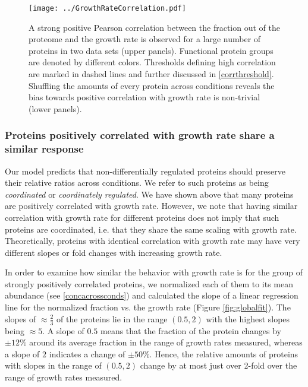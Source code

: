 \documentclass{article}
\begin{document}
\begin{figure}[H]
\begin{center}
\texttt{[image: ../GrowthRateCorrelation.pdf]}
\caption{\label{fig:growthcorr}
A strong positive Pearson correlation between the fraction out of the proteome and the growth rate is observed for a large number of proteins in two data sets (upper panels).
Functional protein groups are denoted by different colors.
Thresholds defining high correlation are marked in dashed lines and further discussed in \ref{corrthreshold}.
Shuffling the amounts of every protein across conditions reveals the bias towards positive correlation with growth rate is non-trivial (lower panels).
%
}
\end{center}
\end{figure}

\subsubsection{Proteins positively correlated with growth rate share a similar response}
\label{propchange} 
Our model predicts that non-differentially regulated proteins should preserve their relative ratios across conditions.
We refer to such proteins as being \emph{coordinated} or \emph{coordinately regulated}.
We have shown above that many proteins are positively correlated with growth rate.
However, we note that having similar correlation with growth rate for different proteins does not imply that such proteins are coordinated, i.e. that they share the same scaling with growth rate.
Theoretically, proteins with identical correlation with growth rate may have very different slopes or fold changes with increasing growth rate.


In order to examine how similar the behavior with growth rate is for the group of strongly positively correlated proteins, we normalized each of them to its mean abundance (see \ref{concacrossconds}) and calculated the slope of a linear regression line for the normalized fraction vs. the growth rate (Figure \ref{fig:globalfit}).
The slopes of $\approx \frac{2}{3}$ of the proteins lie in the range $(0.5,2)$ with the highest slopes being $\approx 5$.
A slope of $0.5$ means that the fraction of the protein changes by $\pm12\%$ around its average fraction in the range of growth rates measured, whereas a slope of $2$ indicates a change of $\pm50\%$.
Hence, the relative amounts of proteins with slopes in the range of $(0.5,2)$ change by at most just over 2-fold over the range of growth rates measured.
\end{document}
